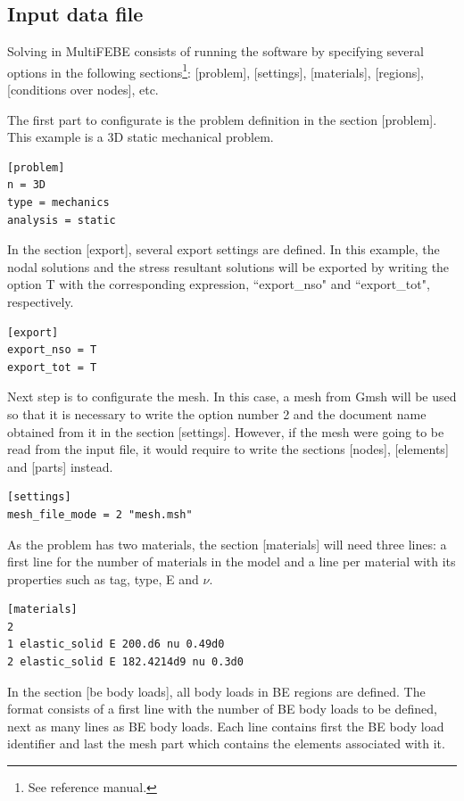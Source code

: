 \documentclass[a4]{article}
\begin{document}
\subsection{Input data file}
Solving in MultiFEBE consists of running the software by specifying several options in the following sections\footnote{See reference manual.}: [problem], [settings], [materials], [regions], [conditions over nodes], etc.

The first part to configurate is the problem definition in the section [problem]. This example is a 3D static mechanical problem.

\begin{Verbatim}	
[problem]
n = 3D
type = mechanics
analysis = static
\end{Verbatim}

In the section [export], several export settings are defined. In this example, the nodal solutions and the stress resultant solutions will be exported by writing the option T with the corresponding expression, ``export\_nso" and ``export\_tot", respectively.

\begin{Verbatim}
[export]
export_nso = T
export_tot = T
\end{Verbatim}

Next step is to configurate the mesh. In this case, a mesh from Gmsh will be used so that it is necessary to write the option number 2 and the document name obtained from it in the section [settings]. However, if the mesh were going to be read from the input file, it would require to write the sections [nodes], [elements] and [parts] instead.

\begin{Verbatim}	
[settings]
mesh_file_mode = 2 "mesh.msh"
\end{Verbatim}

As the problem has two materials, the section [materials] will need three lines: a first line for the number of materials in the model and a line per material with its properties such as tag, type, E and $\nu$.

\begin{Verbatim}
[materials]
2
1 elastic_solid E 200.d6 nu 0.49d0
2 elastic_solid E 182.4214d9 nu 0.3d0
\end{Verbatim}

In the section [be body loads], all body loads in BE regions are defined. The format consists of a first line with the number of BE body loads to be defined, next as many lines as BE body loads. Each line contains first the BE body load identifier and last the mesh part which contains the elements associated with it.
\end{document}
